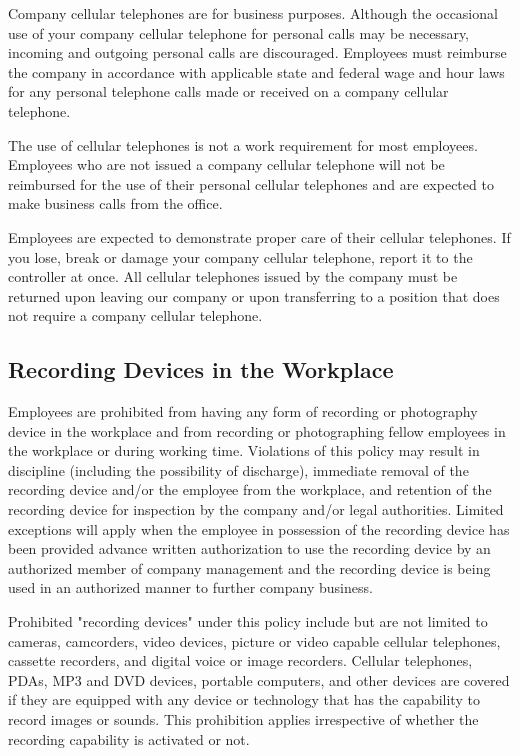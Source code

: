 Company cellular telephones are for business purposes. Although the occasional use of your company cellular telephone for personal calls may be necessary, incoming and outgoing personal calls are discouraged. Employees must reimburse the company in accordance with applicable state and federal wage and hour laws for any personal telephone calls made or received on a company cellular telephone.

The use of cellular telephones is not a work requirement for most employees. Employees who are not issued a company cellular telephone will not be reimbursed for the use of their personal cellular telephones and are expected to make business calls from the office.

Employees are expected to demonstrate proper care of their cellular telephones. If you lose, break or damage your company cellular telephone, report it to the controller at once. All cellular telephones issued by the company must be returned upon leaving our company or upon transferring to a position that does not require a company cellular telephone.

\subsection{Recording Devices in the Workplace}

Employees are prohibited from having any form of recording or photography device in the workplace and from recording or photographing fellow employees in the workplace or during working time. Violations of this policy may result in discipline (including the possibility of discharge), immediate removal of the recording device and/or the employee from the workplace, and retention of the recording device for inspection by the company and/or legal authorities. Limited exceptions will apply when the employee in possession of the recording device has been provided advance written authorization to use the recording device by an authorized member of company management and the recording device is being used in an authorized manner to further company business.

Prohibited "recording devices" under this policy include but are not limited to cameras, camcorders, video devices, picture or video capable cellular telephones, cassette recorders, and digital voice or image recorders. Cellular telephones, PDAs, MP3 and DVD devices, portable computers, and other devices are covered if they are equipped with any device or technology that has the capability to record images or sounds. This prohibition applies irrespective of whether the recording capability is activated or not.

